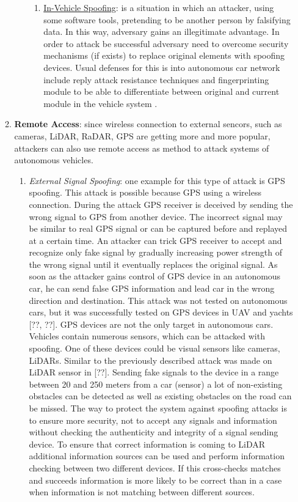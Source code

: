 \begin{itemize}
\begin{enumerate}
\begin{enumerate}
\begin{enumerate}
				\item \underline{In-Vehicle Spoofing}: is a situation in which an attacker, using some software tools, pretending to be another person by falsifying data. In this way, adversary gains an illegitimate advantage. In order to attack be successful adversary need to overcome security mechanisms (if exists) to replace original elements with spoofing devices. Usual defenses for this is into autonomous car network include reply attack resistance techniques and fingerprinting module to be able to differentiate between original and current module in the vehicle system \cite{attacTax1}.
			\end{enumerate}
		\end{enumerate}
		\item \textbf{Remote Access}: since wireless connection to external sencors, such as cameras, \gls{LiDAR}, \gls{RaDAR}, \gls{GPS} are getting more and more popular, attackers can also use remote access as method to attack systems of autonomous vehicles. 
		\begin{enumerate}
			\item \textit{External Signal Spoofing}: one example for this type of attack is \gls{GPS} spoofing. This attack is possible because \gls{GPS} using a wireless connection. During the attack \gls{GPS} receiver is deceived by sending the wrong signal to \gls{GPS} from another device. The incorrect signal may be similar to real \gls{GPS} signal or can be captured before and replayed at a certain time. An attacker can trick \gls{GPS} receiver to accept and recognize only fake signal by gradually increasing power strength of the wrong signal until it eventually replaces the original signal. As soon as the attacker gains control of \gls{GPS} device in an autonomous car, he can send false \gls{GPS} information and lead car in the wrong direction and destination. This attack was not tested on autonomous cars, but it was successfully tested on \gls{GPS} devices in \gls{UAV} and yachts [??, ??].
			\gls{GPS} devices are not the only target in autonomous cars. Vehicles contain numerous sensors, which can be attacked with spoofing. One of these devices could be visual sensors like cameras, \glspl{LiDAR}. Similar to the previously described attack was made on \gls{LiDAR} sensor in [??]. Sending fake signals to the device in a range between 20 and 250 meters from a car (sensor) a lot of non-existing obstacles can be detected as well as existing obstacles on the road can be missed. 
			The way to protect the system against spoofing attacks is to ensure more security, not to accept any signals and information without checking the authenticity and integrity of a signal sending device. To ensure that correct information is coming to \gls{LiDAR} additional information sources can be used and perform information checking between two different devices. If this cross-checks matches and succeeds information is more likely to be correct than in a case when information is not matching between different sources.

\end{enumerate}
\end{enumerate}
\end{itemize}
